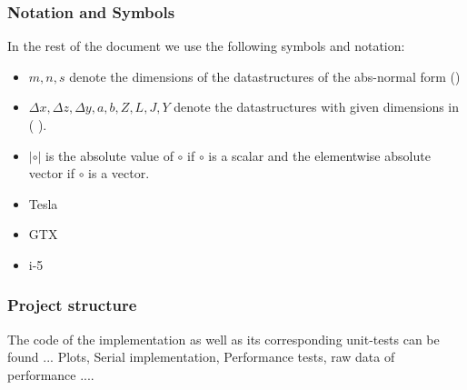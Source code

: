 \subsubsection{Notation and Symbols}
In the rest of the document we use the following symbols and notation:
\begin{itemize}
	\item $m,n,s$ denote the dimensions of the datastructures of the abs-normal form (\label{absnf})
	\item $\Delta x, \Delta z, \Delta y, a,b ,Z ,L,J,Y$ denote the datastructures with given dimensions in ( \label{absnf}).
	\item $|\circ|$ is the absolute value of $\circ$ if $\circ$ is a scalar and the elementwise absolute vector if $\circ$ is a vector.
\end{itemize}

\begin{itemize}
	\item Tesla
	\item GTX
	\item i-5
\end{itemize}
\subsubsection{Project structure}
The code of the implementation as well as its corresponding unit-tests can be found ...
Plots, Serial implementation, Performance tests, raw data of performance ....